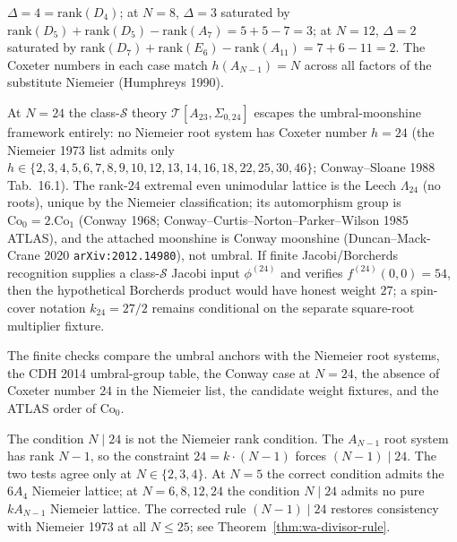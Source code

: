 \begin{remark}
\begin{enumerate}[label=\textup{(\arabic*)}]
$\Delta = 4 = \mathrm{rank}(D_4)$; at $N = 8$,
$\Delta = 3$ saturated by
$\mathrm{rank}(D_5) + \mathrm{rank}(D_5) - \mathrm{rank}(A_7) = 5 + 5 - 7 = 3$;
at $N = 12$, $\Delta = 2$ saturated by
$\mathrm{rank}(D_7) + \mathrm{rank}(E_6) - \mathrm{rank}(A_{11}) = 7 + 6 - 11 = 2$.
The Coxeter numbers in each case match $h(A_{N-1}) = N$ across all
factors of the substitute Niemeier (Humphreys 1990).
\end{enumerate}
At $N = 24$ the class-$\mathcal S$ theory $\mathcal T[A_{23},
\Sigma_{0, 24}]$ escapes the umbral-moonshine framework entirely:
no Niemeier root system has Coxeter number $h = 24$ (the
Niemeier 1973 list admits only $h \in \{2, 3, 4, 5, 6, 7, 8, 9,
10, 12, 13, 14, 16, 18, 22, 25, 30, 46\}$; Conway--Sloane 1988
Tab.\ 16.1). The rank-$24$ extremal even unimodular lattice is the
Leech $\Lambda_{24}$ (no roots), unique by the Niemeier
classification; its automorphism group is
$\mathrm{Co}_0 = 2.\mathrm{Co}_1$ (Conway 1968; Conway--Curtis--Norton--Parker--Wilson
1985 ATLAS), and the attached moonshine is Conway moonshine
(Duncan--Mack-Crane 2020 \texttt{arXiv:2012.14980}), not umbral.
If finite Jacobi/Borcherds recognition supplies a class-$\mathcal S$
Jacobi input $\phi^{(24)}$ and verifies $f^{(24)}(0,0)=54$, then the
hypothetical Borcherds product would have honest weight $27$; a
spin-cover notation $k_{24}=27/2$ remains conditional on the separate
square-root multiplier fixture.

The finite checks compare the umbral anchors with the Niemeier root
systems, the CDH 2014 umbral-group table, the Conway case at
$N=24$, the absence of Coxeter number $24$ in the Niemeier list, the
candidate weight fixtures, and the ATLAS order of $\mathrm{Co}_0$.
\end{remark}

\begin{remark}
\label{rem:wa-heal-divisor}
The condition $N\mid 24$ is not the Niemeier rank condition.
The $A_{N-1}$ root system has rank $N-1$, so the constraint
$24=k\cdot(N-1)$ forces $(N-1)\mid 24$. The two tests agree only at
$N\in\{2,3,4\}$. At $N=5$ the correct condition admits the
$6A_4$ Niemeier lattice; at $N=6,8,12,24$ the condition $N\mid 24$
admits no pure $kA_{N-1}$ Niemeier lattice.
The corrected rule $(N - 1) \mid 24$ restores consistency with
Niemeier 1973 at all $N \le 25$; see
Theorem~\ref{thm:wa-divisor-rule}.
\end{remark}

